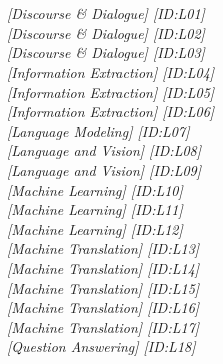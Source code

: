 \section[Poster Session B]{}
\bigskip{}
\par
{}\par
\bigskip{}
\hfill \textit{[Discourse \& Dialogue]  [ID:L01]} \\ 
\hfill \textit{[Discourse \& Dialogue]  [ID:L02]} \\ 
\hfill \textit{[Discourse \& Dialogue]  [ID:L03]} \\ 
\hfill \textit{[Information Extraction]  [ID:L04]} \\ 
\hfill \textit{[Information Extraction]  [ID:L05]} \\ 
\hfill \textit{[Information Extraction]  [ID:L06]} \\ 
\hfill \textit{[Language Modeling]  [ID:L07]} \\ 
\hfill \textit{[Language and Vision]  [ID:L08]} \\ 
\hfill \textit{[Language and Vision]  [ID:L09]} \\ 
\hfill \textit{[Machine Learning]  [ID:L10]} \\ 
\hfill \textit{[Machine Learning]  [ID:L11]} \\ 
\hfill \textit{[Machine Learning]  [ID:L12]} \\ 
\hfill \textit{[Machine Translation]  [ID:L13]} \\ 
\hfill \textit{[Machine Translation]  [ID:L14]} \\ 
\hfill \textit{[Machine Translation]  [ID:L15]} \\ 
\hfill \textit{[Machine Translation]  [ID:L16]} \\ 
\hfill \textit{[Machine Translation]  [ID:L17]} \\ 
\hfill \textit{[Question Answering]  [ID:L18]} \\ 
